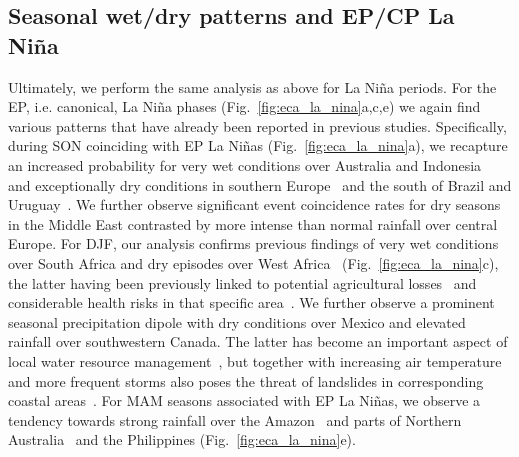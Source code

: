 \documentclass[utf8]{frontiersSCNS} %
\begin{document}
\subsection{Seasonal wet/dry patterns and EP/CP La Ni\~na}

Ultimately, we perform the same analysis as above for La Ni\~na periods. For the EP, i.e. canonical, La Ni\~na phases (Fig.~\ref{fig:eca_la_nina}a,c,e) we again find various patterns that have already been reported in previous studies. Specifically, during SON coinciding with EP La Ni\~nas (Fig.~\ref{fig:eca_la_nina}a), we recapture an increased probability for very wet conditions over Australia and Indonesia~\citep{arblaster_interdecadal_2002} and exceptionally dry conditions in southern Europe~\citep{pozo-vazquez_ninosouthern_2005} and the south of Brazil and Uruguay~\citep{ropelewski_quantifying_1996}. We further observe significant event coincidence rates for dry seasons in the Middle East contrasted by more intense than normal rainfall over central Europe. For DJF, our analysis confirms previous findings of very wet conditions over South Africa and dry episodes over West Africa~\citep{nicholson_influence_2000} (Fig.~\ref{fig:eca_la_nina}c), the latter having been previously linked to potential agricultural losses~\citep{Karpouzoglou_2014} and considerable health risks in that specific area~\citep{Rataj_2016}. We further observe a prominent seasonal precipitation dipole with dry conditions over Mexico and elevated rainfall over southwestern Canada. The latter has become an important aspect of local water resource management~\citep{lute_rolw_2014}, but together with increasing air temperature and more frequent storms also poses the threat of landslides in corresponding coastal areas~\citep{Guthrie_2010}. For MAM seasons associated with EP La Ni\~nas, we observe a tendency towards strong rainfall over the Amazon~\citep{rogers_precipitation_1988} and parts of Northern Australia~\citep{arblaster_interdecadal_2002} and the Philippines (Fig.~\ref{fig:eca_la_nina}e).  
\end{document}
